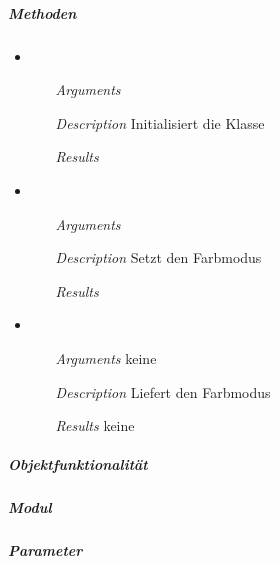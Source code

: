 \subparagraph{Methoden}
\begin{itemize}

\item {}
\begin{enumerate}
\item[\textit{Arguments}] 
\item[\textit{Description}] Initialisiert die Klasse
\item[\textit{Results}] 
\end{enumerate}

\item {}
\begin{enumerate}
\item[\textit{Arguments}]  
\item[\textit{Description}] Setzt den Farbmodus
\item[\textit{Results}] 
\end{enumerate}

\item {}
\begin{enumerate}
\item[\textit{Arguments}] keine 
\item[\textit{Description}] Liefert den Farbmodus
\item[\textit{Results}] keine
\end{enumerate}

\end{itemize}


\newpage

\subparagraph{Objektfunktionalit\"at}


\newpage

\paragraph{}
\subparagraph{Modul}


\subparagraph{Parameter}

